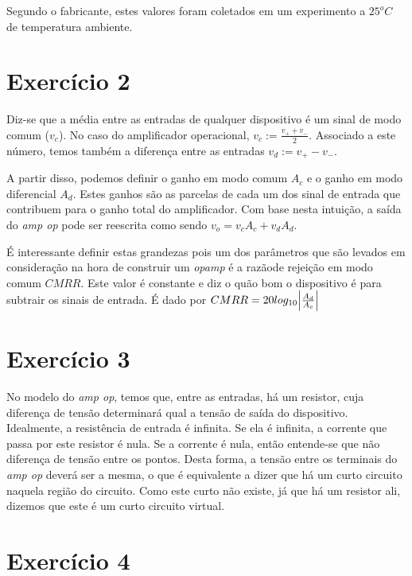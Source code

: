 \documentclass[12pt, a4paper, twoside]{article}
\begin{document}
Segundo o fabricante, estes valores foram coletados em um experimento a $25^oC$ de temperatura ambiente.

\section{Exercício 2}

Diz-se que a média entre as entradas de qualquer dispositivo é um sinal de modo comum ($v_c$). No caso do amplificador operacional, $v_c := \frac{v_+ + v_-}{2}$. Associado a este número, temos também a diferença entre as entradas $v_d := v_+ - v_-$.

A partir disso, podemos definir o ganho em modo comum $A_c$ e o ganho em modo diferencial $A_d$. Estes ganhos são as parcelas de cada um dos sinal de entrada que contribuem para o ganho total do amplificador. Com base nesta intuição, a saída do \textit{amp op} pode ser reescrita como sendo $v_o = v_c A_c + v_d A_d$.

É interessante definir estas grandezas pois um dos parâmetros que são levados em consideração na hora de construir um \textit{opamp} é a razãode rejeição em modo comum $CMRR$. Este valor é constante e diz o quão bom o dispositivo é para subtrair os sinais de entrada. É dado por $CMRR = 20 log_{10} \abs{\frac{A_d}{A_c}} $

\section{Exercício 3}

No modelo do \textit{amp op}, temos que, entre as entradas, há um resistor, cuja diferença de tensão determinará qual a tensão de saída do dispositivo. Idealmente, a resistência de entrada é infinita. Se ela é infinita, a corrente que passa por este resistor é nula. Se a corrente é nula, então entende-se que não diferença de tensão entre os pontos. Desta forma, a tensão entre os terminais do \textit{amp op} deverá ser a mesma, o que é equivalente a dizer que há um curto circuito naquela região do circuito. Como este curto não existe, já que há um resistor ali, dizemos que este é um curto circuito virtual.

\section{Exercício 4}
\end{document}
